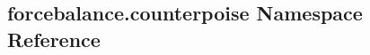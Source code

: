 \hypertarget{namespaceforcebalance_1_1counterpoise}{\subsection{forcebalance.\-counterpoise Namespace Reference}
\label{namespaceforcebalance_1_1counterpoise}
}
